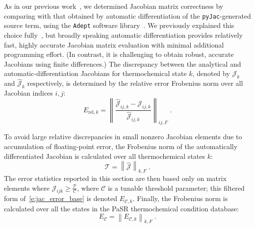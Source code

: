 \documentclass[12pt,number,sort&compress,preprint]{elsarticle}
\newcommand{\revise}[1]{{\sloppy\textcolor{RoyalPurple}{#1}}}  %
\begin{document}
As in our previous work~\cite{Niemeyer:2016aa}, we determined Jacobian matrix correctness by comparing with that obtained by automatic differentiation of the \texttt{pyJac}-generated source term, using the \texttt{Adept} software library~\cite{adept-v11,hogan2014fast}.
We previously explained this choice fully~\cite{Niemeyer:2016aa}, but broadly speaking automatic differentiation provides relatively fast, highly accurate Jacobian matrix evaluation with minimal additional programming effort.
\revise{(In contrast, it is challenging to obtain robust, accurate Jacobians using finite differences.)}
The discrepancy between the analytical and automatic-differentiation Jacobians for thermochemical state $k$, denoted by $\mathcal{J}_k$ and $\hat{\mathcal{J}}_k$ respectively, is determined by the relative error Frobenius norm over all Jacobian indices $i, j$:
\begin{equation}
 \label{e:jac_error_base}
 E_{\text{rel}, k} = \left\lVert \frac{\hat{\mathcal{J}}_{ij,k} - \mathcal{J}_{ij,k}}{\hat{\mathcal{J}}_{ij,k}} \right\rVert_{ij,F} \;.
\end{equation}

To avoid large relative discrepancies in small nonzero Jacobian elements due to accumulation of floating-point error, the Frobenius norm of the automatically differentiated Jacobian is calculated over all thermochemical states $k$:
\begin{equation}
 \label{e:thresh}
 \mathcal{T} = \left\lVert \mathcal{\hat{J}} \right\rVert_{k, F} \;.
\end{equation}
The error statistics reported in this section are then based only on matrix elements where $\mathcal{J}_{ijk} \ge \frac{\mathcal{T}}{\mathcal{C}}$, where $\mathcal{C}$ is \revise{a tunable} threshold parameter; this filtered form of~\cref{e:jac_error_base} is denoted $E_{\mathcal{C},k}$.
Finally, the Frobenius norm is calculated over all the states in the PaSR thermochemical condition database:
\begin{equation}
 \label{e:thresholded_error}
 E_{\mathcal{C}} = \left\lVert E_{\mathcal{C},k} \right\rVert_{k, F} \;.
\end{equation}
\end{document}
